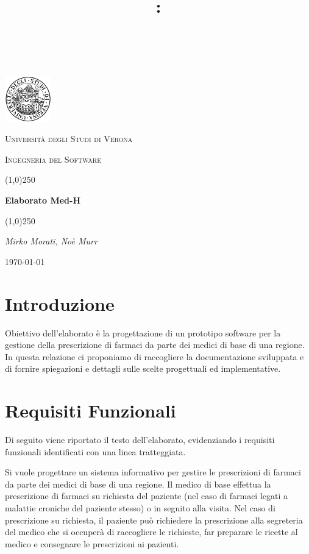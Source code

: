 \documentclass[a4paper, 11pt]{article}
\title{
	\vspace{2in}
	\textmd{\textbf{\hmwkClass:\\ \hmwkTitle}}\\
	\vspace{0.1in}\large{\textit{\hmwkAuthorName}}
	\vspace{3in}
}
\begin{document}
	\clearpage
\begin{titlepage}
	\centering
	\vspace*{\fill}
	\includegraphics[width=0.15\textwidth]{logo.png}\par\vspace{1cm}
	{\scshape\LARGE Università degli Studi di Verona \par}
	\vspace{1cm}
	{\scshape\Large Ingegneria del Software\par}
	\vspace{1.5cm}
	\line(1,0){250} \\
	{\huge\bfseries Elaborato Med-H\par}
	\line(1,0){250} \\
	\vspace{2cm}
	{\Large\itshape Mirko Morati, Noè Murr\par}
	\vspace{5cm}
	\vspace*{\fill}
	{\large \today\par}
\end{titlepage}
\thispagestyle{empty}
\newpage
\tableofcontents
\newpage

\section{Introduzione}
Obiettivo dell'elaborato è la progettazione di un prototipo software per la gestione della prescrizione di farmaci da parte dei medici di base di una regione.
In questa relazione ci proponiamo di raccogliere la documentazione sviluppata e di fornire spiegazioni e dettagli sulle scelte progettuali ed implementative. 

\section{Requisiti Funzionali}
Di seguito viene riportato il testo dell'elaborato, evidenziando i requisiti funzionali identificati con una linea tratteggiata.

Si vuole progettare un sistema informativo per gestire le prescrizioni di farmaci da parte dei medici di base di una regione. Il medico di base effettua la prescrizione di farmaci su richiesta del paziente (nel caso di farmaci legati a malattie croniche del paziente stesso) o in seguito alla visita. Nel caso di prescrizione su richiesta, il paziente può richiedere la prescrizione alla segreteria del medico che si occuperà di raccogliere le richieste, far preparare le ricette al medico e consegnare le prescrizioni ai pazienti.
\end{document}
